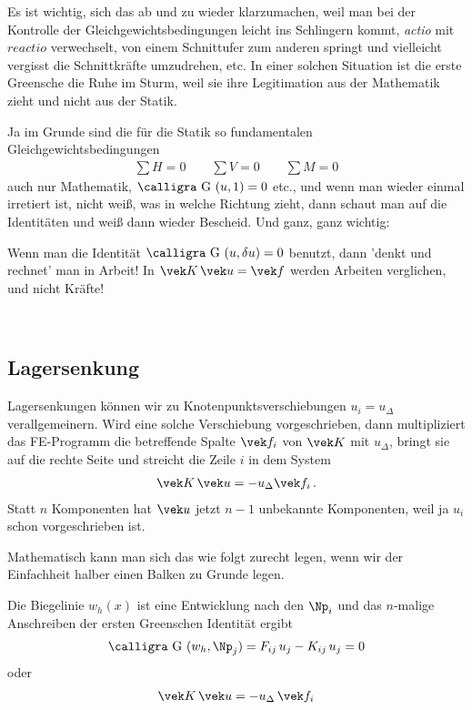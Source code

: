 {{{Es ist wichtig, sich das ab und zu wieder klarzumachen, weil man bei der Kontrolle der Gleichgewichtsbedingungen leicht ins Schlingern kommt, {\em actio\/} mit $reactio$ verwechselt, von einem Schnittufer zum anderen springt und vielleicht vergisst die Schnittkr\"{a}fte umzudrehen, etc. In einer solchen Situation ist die erste Greensche die Ruhe im Sturm, weil sie ihre Legitimation aus der Mathematik zieht und nicht aus der Statik.

Ja im Grunde sind die f\"{u}r die Statik so fundamentalen Gleichgewichtsbedingungen
\begin{align}
\sum H = 0 \qquad \sum V = 0 \qquad \sum M = 0
\end{align}
auch nur Mathematik, $\text{\normalfont\calligra G\,\,}(u,1) = 0$ etc., und wenn man wieder einmal irretiert ist, nicht wei{\ss}, was in welche Richtung zieht, dann schaut man auf die Identit\"{a}ten und wei{\ss} dann wieder Bescheid. Und ganz, ganz wichtig:\\

\hspace*{-12pt}\colorbox{hellgrau}{\parbox{0.98\textwidth}{Wenn man die Identit\"{a}t $\text{\normalfont\calligra G\,\,}(u,\delta u) = 0$ benutzt, dann 'denkt und rechnet' man in Arbeit! In $\vek K\,\vek u = \vek f$ werden Arbeiten verglichen, und nicht Kr\"{a}fte! }}\\

\textcolor{blau2}{\subsection{Lagersenkung}}
Lagersenkungen k\"{o}nnen wir zu Knotenpunktsverschiebungen $u_i = u_\Delta$ verallgemeinern. Wird eine solche Verschiebung vorgeschrieben, dann multipliziert das FE-Programm die betreffende Spalte $\vek f_i$ von $\vek K$ mit $u_\Delta$, bringt sie auf die rechte Seite und streicht die Zeile $i$ in dem System
\begin{align}
\vek K\,\vek u = - u_\Delta \vek f_i\,.
\end{align}
Statt $n$ Komponenten hat $\vek u$ jetzt $n-1$ unbekannte Komponenten, weil ja $u_i$ schon vorgeschrieben ist.

Mathematisch kann man sich das wie folgt zurecht legen, wenn wir der Einfachheit halber einen Balken zu Grunde legen.

Die Biegelinie $w_h(x)$ ist eine Entwicklung nach den $\Np_i$ und das $n$-malige Anschreiben der ersten Greenschen Identit\"{a}t ergibt
 \begin{align}
 \text{\normalfont\calligra G\,\,}(w_h,\Np_j) = F_{ij}\,u_j - K_{ij}\,u_j = 0
 \end{align}
oder
\begin{align}
\vek K\,\vek u = - u_\Delta\,\vek f_i
\end{align}

}}}
